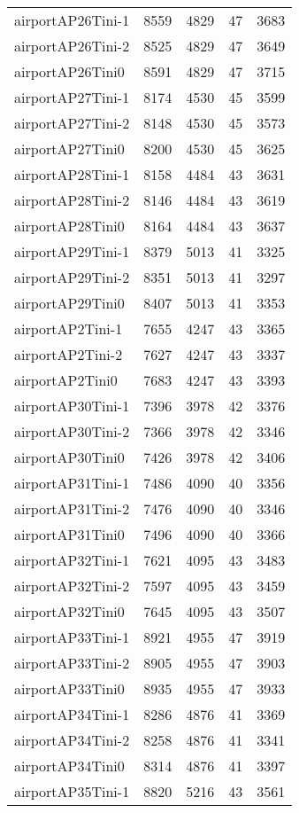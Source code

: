 \begin{longtable}{lrrrr}
airportAP26Tini-1 & 8559 & 4829 & 47 & 3683 \\
airportAP26Tini-2 & 8525 & 4829 & 47 & 3649 \\
airportAP26Tini0 & 8591 & 4829 & 47 & 3715 \\
airportAP27Tini-1 & 8174 & 4530 & 45 & 3599 \\
airportAP27Tini-2 & 8148 & 4530 & 45 & 3573 \\
airportAP27Tini0 & 8200 & 4530 & 45 & 3625 \\
airportAP28Tini-1 & 8158 & 4484 & 43 & 3631 \\
airportAP28Tini-2 & 8146 & 4484 & 43 & 3619 \\
airportAP28Tini0 & 8164 & 4484 & 43 & 3637 \\
airportAP29Tini-1 & 8379 & 5013 & 41 & 3325 \\
airportAP29Tini-2 & 8351 & 5013 & 41 & 3297 \\
airportAP29Tini0 & 8407 & 5013 & 41 & 3353 \\
airportAP2Tini-1 & 7655 & 4247 & 43 & 3365 \\
airportAP2Tini-2 & 7627 & 4247 & 43 & 3337 \\
airportAP2Tini0 & 7683 & 4247 & 43 & 3393 \\
airportAP30Tini-1 & 7396 & 3978 & 42 & 3376 \\
airportAP30Tini-2 & 7366 & 3978 & 42 & 3346 \\
airportAP30Tini0 & 7426 & 3978 & 42 & 3406 \\
airportAP31Tini-1 & 7486 & 4090 & 40 & 3356 \\
airportAP31Tini-2 & 7476 & 4090 & 40 & 3346 \\
airportAP31Tini0 & 7496 & 4090 & 40 & 3366 \\
airportAP32Tini-1 & 7621 & 4095 & 43 & 3483 \\
airportAP32Tini-2 & 7597 & 4095 & 43 & 3459 \\
airportAP32Tini0 & 7645 & 4095 & 43 & 3507 \\
airportAP33Tini-1 & 8921 & 4955 & 47 & 3919 \\
airportAP33Tini-2 & 8905 & 4955 & 47 & 3903 \\
airportAP33Tini0 & 8935 & 4955 & 47 & 3933 \\
airportAP34Tini-1 & 8286 & 4876 & 41 & 3369 \\
airportAP34Tini-2 & 8258 & 4876 & 41 & 3341 \\
airportAP34Tini0 & 8314 & 4876 & 41 & 3397 \\
airportAP35Tini-1 & 8820 & 5216 & 43 & 3561 \\

\end{longtable}
